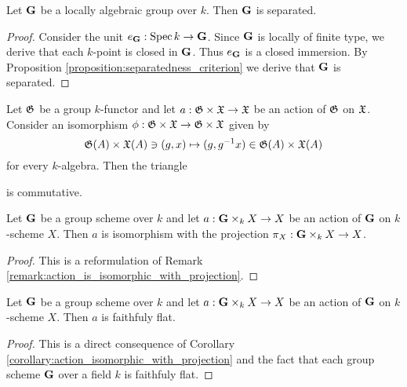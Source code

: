 \begin{corollary}\label{corollary:locally_algebraic_groups_are_separated}
Let $\mathbf{G}$ be a locally algebraic group over $k$. Then $\mathbf{G}$ is separated. 
\end{corollary}
\begin{proof}
Consider the unit $e_{\mathbf{G}}:\mathrm{Spec}\, k \rightarrow \mathbf{G}$. Since $\mathbf{G}$ is locally of finite type, we derive that each $k$-point is closed in $\mathbf{G}$. Thus $e_{\mathbf{G}}$ is a closed immersion. By Proposition \ref{proposition:separatedness_criterion} we derive that $\mathbf{G}$ is separated.
\end{proof}

\begin{remark}\label{remark:action_is_isomorphic_with_projection}
Let ${\mathfrak G}$ be a group $k$-functor and let $a:{\mathfrak G} \times {\mathfrak X} \rightarrow {\mathfrak X}$ be an action of ${\mathfrak G}$ on ${\mathfrak X}$. Consider an isomorphism $\phi:{\mathfrak G}\times {\mathfrak X}\rightarrow {\mathfrak G}\times {\mathfrak X}$ given by
$${\mathfrak G}(A)\times {\mathfrak X}(A)\ni (g,x)\mapsto (g,g^{-1}x)\in {\mathfrak G}(A)\times {\mathfrak X}(A)$$
for every $k$-algebra. Then the triangle
\begin{center}
\end{center}
is commutative.
\end{remark}

\begin{corollary}\label{corollary:action_isomorphic_with_projection}
Let $\mathbf{G}$ be a group scheme over $k$ and let $a:\mathbf{G}\times_k X\rightarrow X$ be an action of $\mathbf{G}$ on $k$-scheme $X$. Then $a$ is isomorphism with the projection $\pi_X:\mathbf{G}\times_k X\rightarrow X$.
\end{corollary}
\begin{proof}
This is a reformulation of Remark \ref{remark:action_is_isomorphic_with_projection}.
\end{proof}

\begin{corollary}\label{corollary:action_is_flat}
Let $\mathbf{G}$ be a group scheme over $k$ and let $a:\mathbf{G}\times_k X\rightarrow X$ be an action of $\mathbf{G}$ on $k$-scheme $X$. Then $a$ is faithfuly flat.
\end{corollary}
\begin{proof}
This is a direct consequence of Corollary \ref{corollary:action_isomorphic_with_projection} and the fact that each group scheme $\mathbf{G}$ over a field $k$ is faithfuly flat.
\end{proof}

